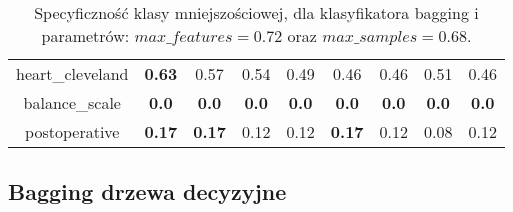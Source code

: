 \begin{table}[H]
\begin{center}
{\begin{tabular}{c|cccccccc}
				heart\_cleveland&\textbf{0.63}&0.57&0.54&0.49&0.46&0.46&0.51&0.46\\%
				balance\_scale&\textbf{0.0}&\textbf{0.0}&\textbf{0.0}&\textbf{0.0}&\textbf{0.0}&\textbf{0.0}&\textbf{0.0}&\textbf{0.0}\\%
				postoperative&\textbf{0.17}&\textbf{0.17}&0.12&0.12&\textbf{0.17}&0.12&0.08&0.12\\%
			\end{tabular}}
			\caption{Specyficzność klasy mniejszościowej, dla klasyfikatora bagging i parametrów: $max\_features = 0.72$ oraz $max\_samples = 0.68$.}
			\label{baggin_spec2}
		\end{center}
	\end{table}
\subsection{Bagging drzewa decyzyjne}
